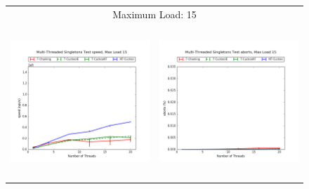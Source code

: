 \begin{figure}[h!]
\begin{tabular}{|cc|}
        \hline 
        \multicolumn{2}{|c|}{{\footnotesize Maximum Load: 15}}\\
        \includegraphics[height=2.25in]{maps/15HM1M:F34,I33,E33speed.png} &
    \includegraphics[height=2.25in]{maps/15HM1M:F34,I33,E33aborts.png}\\
    \hline 
    \end{tabular}
\label{fig:ntqueues}
\end{figure}

